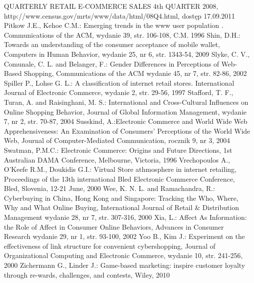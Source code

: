 {\begin{thebibliography}{40}
     QUARTERLY RETAIL E-COMMERCE SALES 4th QUARTER 2008, http://www.census.gov/mrts/www/data/html/08Q4.html, dostęp 17.09.2011
     Pitkow J.E., Kehoe C.M.: Emerging trends in the www user population . Communications of the ACM, wydanie 39, str. 106-108, C.M. 1996
     Shin, D.H.: Towards an understanding of the consumer acceptance of mobile wallet,
Computers in Human Behavior, wydanie 25, nr 6, str. 1343-54, 2009
     Slyke, C. V., Comunale, C. L. and Belanger, F.: Gender Differences in Perceptions of Web-Based Shopping, Communications of the ACM wydanie 45, nr 7, str. 82-86, 2002
     Spiller P., Lohse G. L.: A classification of internet retail stores. International Journal of Electronic Commerce, wydanie 2, str. 29-56, 1997
     Stafford, T. F., Turan, A. and Raisinghani, M. S.: International and Cross-Cultural Influences on Online Shopping Behavior, Journal of Global Information Management, wydanie 7, nr 2, str. 70-87, 2004
     Susskind, A.:Electronic Commerce and World Wide Web Apprehensiveness: An Examination of Consumers' Perceptions of the World Wide Web, Journal of Computer-Mediated Communication, rocznik 9, nr 3, 2004
     Swatman, P.M.C.: Electronic Commerce: Origins and Future Directions, 1st
Australian DAMA Conference, Melbourne, Victoria, 1996
     Vrechopoulos A., O'Keefe R.M., Doukidis G.I.: Virtual Store athmosphere in internet retailing, Proceedings of the 13th international Bled Electronic Commerce Conference, Bled, Slovenia, 12-21 June, 2000
     Wee, K. N. L. and Ramachandra, R.: Cyberbuying in China, Hong Kong and Singapore: Tracking the Who, Where, Why and What Online Buying, International Journal of Retail \& Distribution Management wydanie 28, nr 7, str. 307-316, 2000
     Xia, L.: Affect As Information: the Role of Affect in Consumer Online Behaviors, Advances in Consumer Research wydanie 29, nr 1, str. 93-100, 2002
     Yoo B., Kim J.: Experiment on the effectiveness of link structure for convenient cybershopping, Journal of Organizational Computing and Electronic Commerce, wydanie 10, str. 241-256, 2000
     Zichermann G., Linder J.: Game-based marketing: inspire customer loyalty through re-wards, challenges, and contests, Wiley, 2010

  \end{thebibliography}
  \newpage
}

